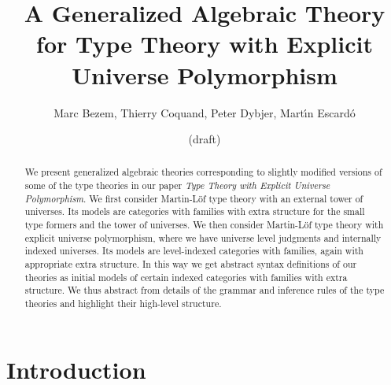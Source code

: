 \documentclass[11pt,a4paper]{article}
\theoremstyle{definition}
\begin{document}
\title{A Generalized Algebraic Theory\\ for Type Theory
with Explicit Universe Polymorphism
}

\author{Marc Bezem, Thierry Coquand, Peter Dybjer, Mart\'{\i}n Escard\'o}

\date{(draft)}
\maketitle

\begin{abstract}
We present generalized algebraic theories corresponding to slightly modified versions of some of the type theories in our paper 
{\em Type Theory with Explicit Universe Polymorphism}. We first consider Martin-Löf type theory with an external tower of universes. Its models are categories with families with extra structure for the small type formers and the tower of universes. We then consider Martin-Löf type theory with explicit universe polymorphism, where we have universe level judgments and internally indexed universes. Its models are level-indexed categories with families, again with appropriate extra structure.
In this way we get abstract syntax definitions of our theories as initial models of certain indexed categories with families with extra structure. We thus abstract from details of the grammar and inference rules of the type theories and highlight their high-level structure.
\end{abstract}

\section{Introduction}
\end{document}
